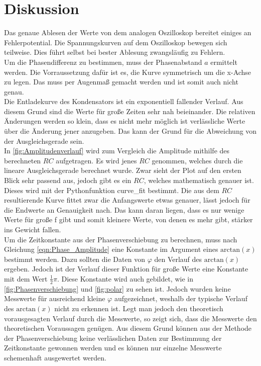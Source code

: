 


\section{Diskussion}

Das genaue Ablesen der Werte von dem analogen Oszilloskop bereitet einiges an Fehlerpotential. 
Die Spannungskurven auf dem Oszilloskop bewegen sich teilweise. Dies führt selbst bei bester Ablesung zwangsläufig zu Fehlern. 
\\
Um die Phasendifferenz zu bestimmen, muss der Phasenabstand $a$ ermittelt werden. Die Vorraussetzung dafür ist es, die 
Kurve symmetrisch um die x-Achse zu legen. Das muss per Augenmaß gemacht werden und ist somit auch nicht genau.
\\
Die Entladekurve des Kondensators ist ein exponentiell fallender Verlauf. Aus diesem Grund sind die Werte für große Zeiten 
sehr nah beieinander. Die relativen Änderungen werden so klein, dass es nicht mehr möglich ist verlässliche Werte über die 
Änderung jener anzugeben. Das kann der Grund für die Abweichung von der Ausgleichsgerade sein.
\\
In \autoref{fig:Amplitudenverlauf} wird zum Vergleich die Amplitude mithilfe des berechneten $RC$ aufgetragen. 
Es wird jenes $RC$ genommen, welches durch die lineare Ausgleichsgerade berechnet wurde. Zwar sieht der Plot auf den ersten Blick 
sehr passend aus, jedoch gibt es ein $RC$, welches mathematisch genauer ist. Dieses wird mit der Pythonfunktion curve\_fit 
bestimmt. Die aus dem $RC$ resultierende Kurve fittet zwar die Anfangswerte etwas genauer, lässt jedoch für die Endwerte an 
Genauigkeit nach. Das kann daran liegen, dass es nur wenige Werte für große f gibt und somit kleinere Werte, von denen es 
mehr gibt, stärker ins Gewicht fallen. 
\\
Um die Zeitkonstante aus der Phasenverschiebung zu berechnen, muss nach Gleichung \eqref{eqn:Phase_Amplitude} eine Konstante 
im Argument eines $\text{arctan}(x)$ bestimmt werden. Dazu sollten die Daten von $\varphi$ den Verlauf des 
$\text{arctan}(x)$ ergeben. Jedoch ist der Verlauf dieser Funktion für große Werte eine Konstante mit dem Wert $\frac{1}{2} \pi$.
Diese Konstante wird auch gebildet, wie in \ref{fig:Phasenverschiebung} und \ref{fig:polar} zu sehen ist. 
Jedoch wurden keine Messwerte für ausreichend kleine $\varphi$ aufgezeichnet, weshalb der typische Verlauf des $\text{arctan}(x)$
nicht zu erkennen ist. Legt man jedoch den theoretisch vorausgesagten Verlauf durch die Messwerte, so zeigt sich, dass 
die Messwerte den theoretischen Voraussagen genügen.
Aus diesem Grund können aus der Methode der Phasenverschiebung keine verlässlichen Daten zur Bestimmung 
der Zeitkonstante gewonnen werden und es können nur einzelne Messwerte schemenhaft ausgewertet werden.
\label{sec:Diskussion}



